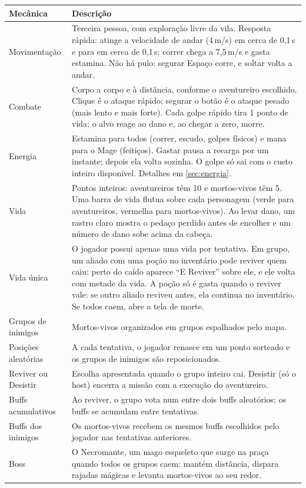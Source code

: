 \documentclass[11pt,a4paper]{article}
\begin{document}
\begin{tabularx}{\textwidth}{@{}lX@{}}
\toprule
\textbf{Mecânica} & \textbf{Descrição} \\
\midrule
Movimentação & Terceira pessoa, com exploração livre da vila. Resposta rápida: atinge a velocidade de andar (4\,m/s) em cerca de 0,1\,s e para em cerca de 0,1\,s; correr chega a 7,5\,m/s e gasta estamina. Não há pulo: segurar Espaço corre, e soltar volta a andar. \\
Combate & Corpo a corpo e à distância, conforme o aventureiro escolhido. Clique é o ataque rápido; segurar o botão é o ataque pesado (mais lento e mais forte). Cada golpe rápido tira 1 ponto de vida; o alvo reage ao dano e, ao chegar a zero, morre. \\
Energia & Estamina para todos (correr, escudo, golpes físicos) e mana para o Mage (feitiços). Gastar pausa a recarga por um instante; depois ela volta sozinha. O golpe só sai com o custo inteiro disponível. Detalhes em \ref{sec:energia}. \\
Vida & Pontos inteiros: aventureiros têm 10 e mortos-vivos têm 5. Uma barra de vida flutua sobre cada personagem (verde para aventureiros, vermelha para mortos-vivos). Ao levar dano, um rastro claro mostra o pedaço perdido antes de encolher e um número de dano sobe acima da cabeça. \\
Vida única & O jogador possui apenas uma vida por tentativa. Em grupo, um aliado com uma poção no inventário pode reviver quem caiu: perto do caído aparece ``E Reviver'' sobre ele, e ele volta com metade da vida. A poção só é gasta quando o reviver vale: se outro aliado reviveu antes, ela continua no inventário. Se todos caem, abre a tela de morte. \\
Grupos de inimigos & Mortos-vivos organizados em grupos espalhados pelo mapa. \\
Posições aleatórias & A cada tentativa, o jogador renasce em um ponto sorteado e os grupos de inimigos são reposicionados. \\
Reviver ou Desistir & Escolha apresentada quando o grupo inteiro cai. Desistir (só o host) encerra a missão com a execução do aventureiro. \\
Buffs acumulativos & Ao reviver, o grupo vota num entre dois buffs aleatórios; os buffs se acumulam entre tentativas. \\
Buffs dos inimigos & Os mortos-vivos recebem os mesmos buffs escolhidos pelo jogador nas tentativas anteriores. \\
Boss & O Necromante, um mago esqueleto que surge na praça quando todos os grupos caem: mantém distância, dispara rajadas mágicas e levanta mortos-vivos ao seu redor. \\

\end{tabularx}
\end{document}
